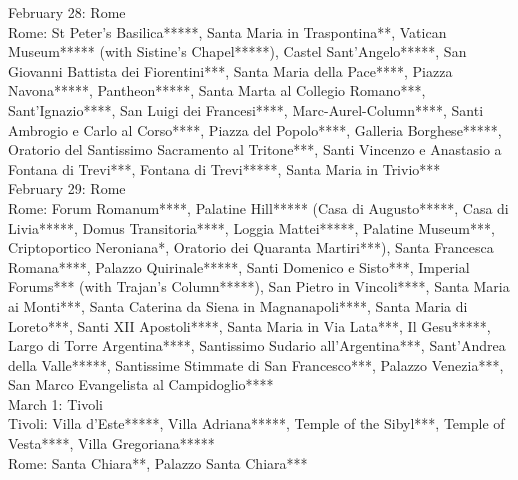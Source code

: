 February 28: Rome\\%

Rome: St Peter's Basilica*****, Santa Maria in Traspontina**, Vatican Museum***** (with Sistine's Chapel*****), Castel Sant'Angelo*****, San Giovanni Battista dei Fiorentini***, Santa Maria della Pace****, Piazza Navona*****, Pantheon*****, Santa Marta al Collegio Romano***, Sant'Ignazio****, San Luigi dei Francesi****, Marc-Aurel-Column****, Santi Ambrogio e Carlo al Corso****, Piazza del Popolo****, Galleria Borghese*****, Oratorio del Santissimo Sacramento al Tritone***, Santi Vincenzo e Anastasio a Fontana di Trevi***, Fontana di Trevi*****, Santa Maria in Trivio***\\%

February 29: Rome\\%

Rome: Forum Romanum****, Palatine Hill***** (Casa di Augusto*****, Casa di Livia*****, Domus Transitoria****, Loggia Mattei*****, Palatine Museum***, Criptoportico Neroniana*, Oratorio dei Quaranta Martiri***), Santa Francesca Romana****, Palazzo Quirinale*****, Santi Domenico e Sisto***, Imperial Forums*** (with Trajan's Column*****), San Pietro in Vincoli****, Santa Maria ai Monti***, Santa Caterina da Siena in Magnanapoli****, Santa Maria di Loreto***, Santi XII Apostoli****, Santa Maria in Via Lata***, Il Gesu*****, Largo di Torre Argentina****, Santissimo Sudario all'Argentina***, Sant'Andrea della Valle*****, Santissime Stimmate di San Francesco***, Palazzo Venezia***, San Marco Evangelista al Campidoglio****\\%

March 1: Tivoli\\

Tivoli: Villa d'Este*****, Villa Adriana*****, Temple of the Sibyl***, Temple of Vesta****, Villa Gregoriana*****\\%
Rome: Santa Chiara**, Palazzo Santa Chiara***\\%

